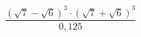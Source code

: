 \begin{ex}[type=calculate]
	\begin{condition}
		\( \dfrac{(\sqrt{7}-\sqrt{6})^3\cdot(\sqrt{7}+\sqrt{6})^3}{0,125} \)
	\end{condition}
\end{ex}